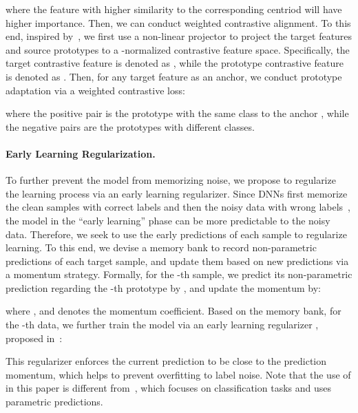 \documentclass{article}
\begin{document}
where the feature with higher similarity to the corresponding centriod will have higher importance. 
Then, we can  conduct weighted contrastive alignment. To this end, inspired by~\cite{chen2020simple}, we first  use a non-linear projector  to project the target features and source prototypes  to a -normalized contrastive feature space. Specifically, the target contrastive feature is denoted as , while the  prototype contrastive feature is  denoted as  . Then, for any target feature  as an anchor, we conduct prototype adaptation via a weighted contrastive loss:

where the positive pair   is the prototype with the same class to the anchor , while the negative pairs  are the prototypes with different classes. 



\paragraph{Early Learning Regularization.}
\label{sec:lreg} 
To further prevent the model from memorizing noise, we propose to regularize the learning process via an early learning regularizer. Since DNNs first memorize the clean samples with correct labels and then the noisy data with wrong labels~\cite{arpit2017closer}, the model in the “early learning” phase can be more predictable to the noisy data. Therefore, we seek to use the early predictions of each sample to regularize learning.
To this end, we devise a memory bank  to record non-parametric predictions of each target sample, and update them based on new predictions via a momentum strategy. Formally, for the -th sample, we predict its non-parametric prediction regarding the -th prototype by  
,
and update the momentum by:

where , and  denotes the momentum coefficient. Based on the memory bank, for the -th data, we further train the model via  an early learning regularizer , proposed in~\cite{liu2020early}:

This regularizer enforces the current prediction to be close to the prediction momentum, which helps to prevent overfitting to label noise. Note that the use of  in this paper is different from~\cite{liu2020early}, which focuses on classification tasks and uses parametric predictions.

 
\end{document}
